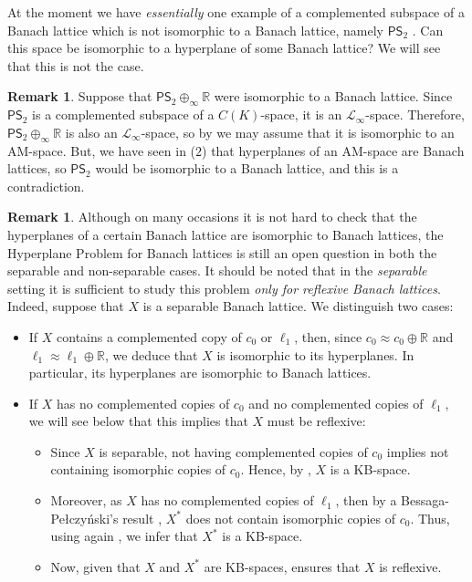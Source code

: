 \documentclass[11pt]{amsart}
\theoremstyle{definition}
\newtheorem{rem}[thm]{Remark}
\numberwithin{equation}{section}
\begin{document}
At the moment we have \textit{essentially} one example of a complemented subspace of a Banach lattice which is not isomorphic to a Banach lattice, namely $\textsf{PS}_2$ \cite{dHMST23}. Can this space be isomorphic to a hyperplane of some Banach lattice? We will see that this is not the case.

\begin{rem}
Suppose that $\textsf{PS}_2\oplus_\infty\mathbb{R}$ were isomorphic to a Banach lattice.  Since $\textsf{PS}_2$ is a complemented subspace of a $C(K)$-space, it is an $\mathcal{L}_\infty$-space. Therefore, $\textsf{PS}_2\oplus_\infty\mathbb{R}$ is also an $\mathcal{L}_\infty$-space, so by \cite[Corollary 2.2]{dHMST23} we may assume that it is isomorphic to an AM-space. But, we have seen in ($2$) that hyperplanes of an AM-space are Banach lattices, so $\textsf{PS}_2$ would be isomorphic to a Banach lattice, and this is a contradiction.
\end{rem}


\begin{rem}
Although on many occasions it is not hard to check that the hyperplanes of a certain Banach lattice are isomorphic to Banach lattices, the Hyperplane Problem for Banach lattices is still an open question in both the separable and non-separable cases. It should be noted that in the \textit{separable} setting it is sufficient to study this problem \textit{only for reflexive Banach lattices}. Indeed, suppose that $X$ is a separable Banach lattice. We distinguish two cases:
\begin{itemize}
    \item If $X$ contains a complemented copy of $c_0$ or $\ell_1$, then, since $c_0\approx c_0\oplus\mathbb{R}$ and $\ell_1\approx\ell_1\oplus\mathbb{R}$, we deduce that $X$ is isomorphic to its hyperplanes. In particular, its hyperplanes are isomorphic to Banach lattices.
    \item If $X$ has no complemented copies of $c_0$ and no complemented copies of $\ell_1$, we will see below that this implies that $X$ must be reflexive:
    \begin{itemize}
        \item Since $X$ is separable, not having complemented copies of $c_0$ implies not containing isomorphic copies of $c_0$. Hence, by \cite[Theorem 2.4.12]{M-N-book}, $X$ is a KB-space.
        \item Moreover, as $X$ has no complemented copies of $\ell_1$, then by a Bessaga-Pe\l{}czy\'{n}ski's result \cite[Proposition 2.e.8]{LT1-book}, $X^*$ does not contain isomorphic copies of $c_0$. Thus, using again \cite[Theorem 2.4.12]{M-N-book}, we infer that $X^*$ is a KB-space.
        \item Now, given that $X$ and $X^*$ are KB-spaces, \cite[Theorem 2.4.15]{M-N-book} ensures that $X$ is reflexive.
    \end{itemize}
\end{itemize}
\end{rem}
\end{document}
